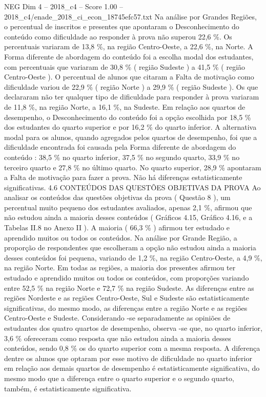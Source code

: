 \begin{textsample}{NEG Dim 4 – 2018\_c4 – Score 1.00 – 2018\_c4/enade\_2018\_ci\_econ\_18745efc57.txt}
Na análise por Grandes Regiões, o percentual de inscritos e presentes que apontaram o Desconhecimento do conteúdo como dificuldade ao responder à prova não superou 22,6 \%.
Os percentuais variaram de 13,8 \%, na região Centro-Oeste, a 22,6 \%, na Norte.
A Forma diferente de abordagem do conteúdo foi a escolha modal dos estudantes, com percentuais que variaram de 30,8 \% ( região Sudeste ) a 41,5 \% ( região Centro-Oeste ).
O percentual de alunos que citaram a Falta de motivação como dificuldade variou de 22,9 \% ( região Norte ) a 29,9 \% ( região Sudeste ).
Os que declararam não ter qualquer tipo de dificuldade para responder à prova variaram de 11,8 \%, na região Norte, a 16,1 \%, na Sudeste.
Em relação aos quartos de desempenho, o Desconhecimento do conteúdo foi a opção escolhida por 18,5 \% dos estudantes do quarto superior e por 16,2 \% do quarto inferior.
A alternativa modal para os alunos, quando agregados pelos quartos de desempenho, foi que a dificuldade encontrada foi causada pela Forma diferente de abordagem do conteúdo : 38,5 \% no quarto inferior, 37,5 \% no segundo quarto, 33,9 \% no terceiro quarto e 27,8 \% no último quarto.
No quarto superior, 28,9 \% apontaram a Falta de motivação para fazer a prova.
Não há diferenças estatisticamente significativas. 4.6 CONTEÚDOS DAS QUESTÕES OBJETIVAS DA PROVA Ao analisar os conteúdos das questões objetivas da prova ( Questão 8 ), um percentual muito pequeno dos estudantes avaliados, apenas 2,1 \%, afirmou que não estudou ainda a maioria desses conteúdos ( Gráficos 4.15, Gráfico 4.16, e a Tabelas II.8 no Anexo II ).
A maioria ( 66,3 \% ) afirmou ter estudado e aprendido muitos ou todos os conteúdos.
Na análise por Grande Região, a proporção de respondentes que escolheram a opção não estudou ainda a maioria desses conteúdos foi pequena, variando de 1,2 \%, na região Centro-Oeste, a 4,9 \%, na região Norte.
Em todas as regiões, a maioria dos presentes afirmou ter estudado e aprendido muitos ou todos os conteúdos, com proporções variando entre 52,5 \% na região Norte e 72,7 \% na região Sudeste.
As diferenças entre as regiões Nordeste e as regiões Centro-Oeste, Sul e Sudeste são estatisticamente significativas, do mesmo modo, as diferenças entre a região Norte e as regiões Centro-Oeste e Sudeste.
Considerando -se separadamente as opiniões de estudantes dos quatro quartos de desempenho, observa -se que, no quarto inferior, 3,6 \% ofereceram como resposta que não estudou ainda a maioria desses conteúdos, sendo 0,8 \% os do quarto superior com a mesma resposta.
A diferença dentre os alunos que optaram por esse motivo de dificuldade no quarto inferior em relação aos demais quartos de desempenho é estatisticamente significativa, do mesmo modo que a diferença entre o quarto superior e o segundo quarto, também, é estatisticamente significativa.

\end{textsample}
